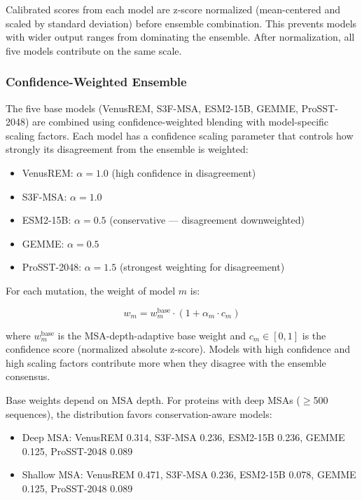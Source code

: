 \documentclass[11pt,a4paper]{article}
\begin{document}
Calibrated scores from each model are z-score normalized (mean-centered and scaled by standard deviation) before ensemble combination. This prevents models with wider output ranges from dominating the ensemble. After normalization, all five models contribute on the same scale.

\subsubsection{Confidence-Weighted Ensemble}

The five base models (VenusREM, S3F-MSA, ESM2-15B, GEMME, ProSST-2048) are combined using confidence-weighted blending with model-specific scaling factors. Each model has a confidence scaling parameter that controls how strongly its disagreement from the ensemble is weighted:

\begin{itemize}
    \item VenusREM: $\alpha = 1.0$ (high confidence in disagreement)
    \item S3F-MSA: $\alpha = 1.0$
    \item ESM2-15B: $\alpha = 0.5$ (conservative --- disagreement downweighted)
    \item GEMME: $\alpha = 0.5$
    \item ProSST-2048: $\alpha = 1.5$ (strongest weighting for disagreement)
\end{itemize}

For each mutation, the weight of model $m$ is:

\begin{equation}
    w_m = w^{\text{base}}_m \cdot (1 + \alpha_m \cdot c_m)
\end{equation}

where $w^{\text{base}}_m$ is the MSA-depth-adaptive base weight and $c_m \in [0, 1]$ is the confidence score (normalized absolute z-score). Models with high confidence and high scaling factors contribute more when they disagree with the ensemble consensus.

Base weights depend on MSA depth. For proteins with deep MSAs ($\geq$500 sequences), the distribution favors conservation-aware models:

\begin{itemize}
    \item Deep MSA: VenusREM 0.314, S3F-MSA 0.236, ESM2-15B 0.236, GEMME 0.125, ProSST-2048 0.089
    \item Shallow MSA: VenusREM 0.471, S3F-MSA 0.236, ESM2-15B 0.078, GEMME 0.125, ProSST-2048 0.089
\end{itemize}
\end{document}
